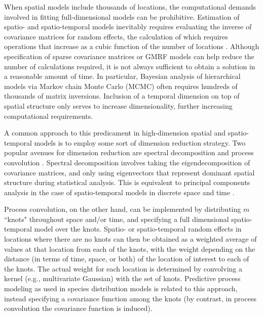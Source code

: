 \documentclass[12pt,english]{article}
\begin{document}
\begin{spacing}{1.9}
When spatial models include thousands of locations, the computational demands involved in fitting full-dimensional models can be prohibitive.  Estimation of spatio- and spatio-temporal models inevitably requires
evaluating the inverse of covariance matrices for random effects, the calculation of which requires operations that increase as a cubic function of the number of locations \citep{Wikle2010}.  Although specification of sparse covariance matrices or GMRF models can help reduce the number of calculations required, it is not always sufficient to obtain a solution in a reasonable amount of time.  In particular, Bayesian analysis of
hierarchical models via Markov chain Monte Carlo (MCMC) often requires hundreds of thousands of matrix inversions.  Inclusion of a temporal dimension on top of spatial structure only serves to increase dimensionality, further increasing computational requirements.

A common approach to this predicament in high-dimension spatial and spatio-temporal models is to employ some sort of dimension reduction strategy. Two popular avenues for dimension reduction are spectral decomposition \citep[also called empirical orthogonal function analysis in geostatistical parlance;][]{Preisendorfer1988} and process convolution \citep[e.g.,][]{Higdon1998}. Spectral decomposition involves taking the eigendecomposition of covariance matrices, and only using eigenvectors that represent dominant spatial structure during statistical analysis.  This is equivalent to principal components analysis in the case of spatio-temporal models in discrete space and time \citep{CressieWikle2011}.

Process convolution, on the other hand, can be implemented by distributing $m$ ``knots" throughout space and/or time, and specifying a full dimensional spatio-temporal model over the knots.  Spatio- or spatio-temporal random effects in locations where there are no knots can then be obtained as a weighted average of values at that location from each of the knots, with the weight depending on the distance (in terms of time, space, or both) of the location of interest to each of the knots.  The actual weight for each location is determined by convolving a kernel (e.g., multivariate Gaussian) with the set of knots.  Predictive process modeling \citep{BanerjeeEtAl2008} as used in species distribution models \citep[e.g.,][]{LatimerEtAl2009} is related to this approach, instead specifying a covariance function among the knots (by contrast, in process convolution the covariance function is induced).


\end{spacing}
\end{document}
